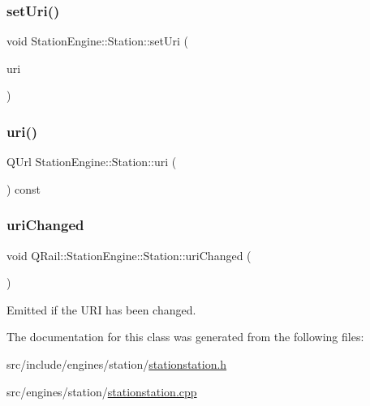 \mbox{\label{classQRail_1_1StationEngine_1_1Station_ab9ae86000a0b84a224dd0ea32256bd27}} 
\subsubsection{\texorpdfstring{setUri()}{setUri()}}
{\footnotesize\ttfamily void Station\+Engine\+::\+Station\+::set\+Uri (\begin{DoxyParamCaption}\item[{const Q\+Url \&}]{uri }\end{DoxyParamCaption})}

\mbox{\label{classQRail_1_1StationEngine_1_1Station_a7ccf866501e2f547935c152b67d192f6}} 
\subsubsection{\texorpdfstring{uri()}{uri()}}
{\footnotesize\ttfamily Q\+Url Station\+Engine\+::\+Station\+::uri (\begin{DoxyParamCaption}{ }\end{DoxyParamCaption}) const}

\mbox{\label{classQRail_1_1StationEngine_1_1Station_a25743385c35feaac93b667a9a828bde8}} 
\subsubsection{\texorpdfstring{uriChanged}{uriChanged}}
{\footnotesize\ttfamily void Q\+Rail\+::\+Station\+Engine\+::\+Station\+::uri\+Changed (\begin{DoxyParamCaption}{ }\end{DoxyParamCaption})\hspace{0.3cm}{\ttfamily [signal]}}



Emitted if the U\+RI has been changed. 



The documentation for this class was generated from the following files\+:\begin{DoxyCompactItemize}
\item 
src/include/engines/station/\mbox{\hyperlink{stationstation_8h}{stationstation.\+h}}\item 
src/engines/station/\mbox{\hyperlink{stationstation_8cpp}{stationstation.\+cpp}}\end{DoxyCompactItemize}
